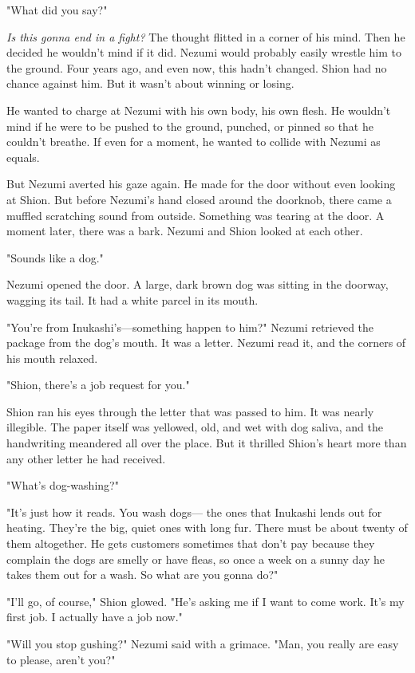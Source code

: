 "What did you say?"

\emph{Is this gonna end in a fight?} The thought flitted in a corner of his
mind. Then he decided he wouldn't mind if it did. Nezumi would probably
easily wrestle him to the ground. Four years ago, and even now, this
hadn't changed. Shion had no chance against him. But it wasn't about
winning or losing.

He wanted to charge at Nezumi with his own body, his own flesh. He
wouldn't mind if he were to be pushed to the ground, punched, or pinned
so that he couldn't breathe. If even for a moment, he wanted to collide
with Nezumi as equals.

But Nezumi averted his gaze again. He made for the door without even
looking at Shion. But before Nezumi's hand closed around the doorknob,
there came a muffled scratching sound from outside. Something was
tearing at the door. A moment later, there was a bark. Nezumi and Shion
looked at each other.

"Sounds like a dog."

Nezumi opened the door. A large, dark brown dog was sitting in the
doorway, wagging its tail. It had a white parcel in its mouth.

"You're from Inukashi's---something happen to him?" Nezumi retrieved the
package from the dog's mouth. It was a letter. Nezumi read it, and the
corners of his mouth relaxed.

"Shion, there's a job request for you."

Shion ran his eyes through the letter that was passed to him. It was
nearly illegible. The paper itself was yellowed, old, and wet with dog
saliva, and the handwriting meandered all over the place. But it
thrilled Shion's heart more than any other letter he had received.


"What's dog-washing?"

"It's just how it reads. You wash dogs--- the ones that Inukashi lends out
for heating. They're the big, quiet ones with long fur. There must be
about twenty of them altogether. He gets customers sometimes that don't
pay because they complain the dogs are smelly or have fleas, so once a
week on a sunny day he takes them out for a wash. So what are you gonna
do?"

"I'll go, of course," Shion glowed. "He's asking me if I want to come
work. It's my first job. I actually have a job now."

"Will you stop gushing?" Nezumi said with a grimace. "Man, you really
are easy to please, aren't you?"

